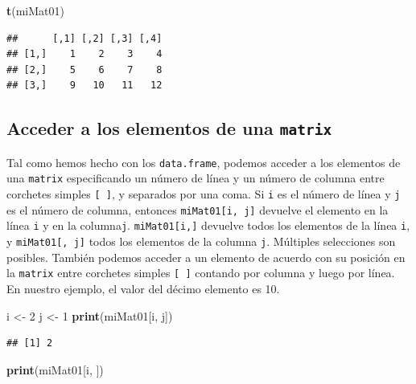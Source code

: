 \documentclass[
]{book}
\newenvironment{Shaded}{\begin{snugshade}}{\end{snugshade}}
\newcommand{\DecValTok}[1]{\textcolor[rgb]{0.00,0.00,0.81}{#1}}
\newcommand{\KeywordTok}[1]{\textcolor[rgb]{0.13,0.29,0.53}{\textbf{#1}}}
\newcommand{\NormalTok}[1]{#1}
\newcommand{\StringTok}[1]{\textcolor[rgb]{0.31,0.60,0.02}{#1}}
\begin{document}
\begin{Shaded}
\begin{Highlighting}[]
\KeywordTok{t}\NormalTok{(miMat01)}
\end{Highlighting}
\end{Shaded}

\begin{verbatim}
##      [,1] [,2] [,3] [,4]
## [1,]    1    2    3    4
## [2,]    5    6    7    8
## [3,]    9   10   11   12
\end{verbatim}

\hypertarget{acceder-a-los-elementos-de-una-matrix}{%
\subsection{\texorpdfstring{Acceder a los elementos de una \texttt{matrix}}{Acceder a los elementos de una matrix}}\label{acceder-a-los-elementos-de-una-matrix}}

Tal como hemos hecho con los \texttt{data.frame}, podemos acceder a los elementos de una \texttt{matrix} especificando un número de línea y un número de columna entre corchetes simples \texttt{{[}\ {]}}, y separados por una coma. Si \texttt{i} es el número de línea y \texttt{j} es el número de columna, entonces \texttt{miMat01{[}i,\ j{]}} devuelve el elemento en la línea \texttt{i} y en la columna\texttt{j}. \texttt{miMat01{[}i,{]}} devuelve todos los elementos de la línea \texttt{i}, y \texttt{miMat01{[},\ j{]}} todos los elementos de la columna \texttt{j}. Múltiples selecciones son posibles. También podemos acceder a un elemento de acuerdo con su posición en la \texttt{matrix} entre corchetes simples \texttt{{[}\ {]}} contando por columna y luego por línea. En nuestro ejemplo, el valor del décimo elemento es 10.

\begin{Shaded}
\begin{Highlighting}[]
\NormalTok{i <-}\StringTok{ }\DecValTok{2}
\NormalTok{j <-}\StringTok{ }\DecValTok{1}
\KeywordTok{print}\NormalTok{(miMat01[i, j])}
\end{Highlighting}
\end{Shaded}

\begin{verbatim}
## [1] 2
\end{verbatim}

\begin{Shaded}
\begin{Highlighting}[]
\KeywordTok{print}\NormalTok{(miMat01[i, ])}
\end{Highlighting}
\end{Shaded}
\end{document}
